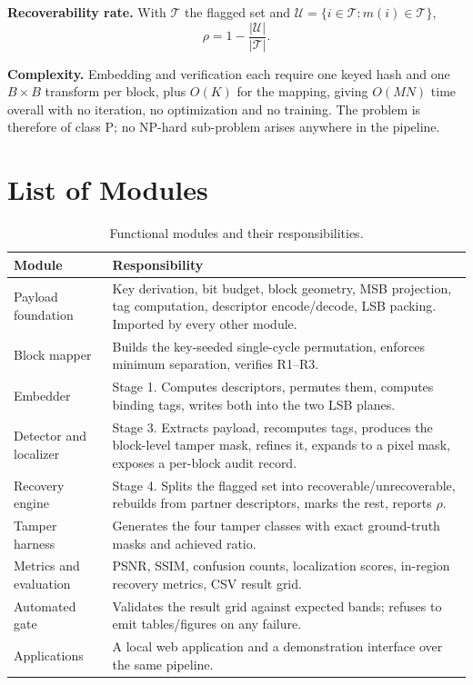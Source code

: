 \documentclass[12pt,a4paper]{article}
\begin{document}
\textbf{Recoverability rate.} With $\mathcal{T}$ the flagged set and
$\mathcal{U} = \{ i \in \mathcal{T} : m(i) \in \mathcal{T} \}$,
\begin{equation}
\rho = 1 - \frac{|\mathcal{U}|}{|\mathcal{T}|} .
\end{equation}

\textbf{Complexity.} Embedding and verification each require one keyed hash and
one $B \times B$ transform per block, plus $O(K)$ for the mapping, giving
$O(MN)$ time overall with no iteration, no optimization and no training. The
problem is therefore of class P; no NP-hard sub-problem arises anywhere in the
pipeline.

\section{List of Modules}

\begin{table}[htbp]
\centering
\caption{Functional modules and their responsibilities.}
\label{tab:modules}
\small
\begin{tabular}{@{}p{1.35in}p{4.0in}@{}}
\toprule
\textbf{Module} & \textbf{Responsibility} \\
\midrule
Payload foundation & Key derivation, bit budget, block geometry, MSB projection, tag computation, descriptor encode/decode, LSB packing. Imported by every other module. \\
Block mapper & Builds the key-seeded single-cycle permutation, enforces minimum separation, verifies R1--R3. \\
Embedder & Stage 1. Computes descriptors, permutes them, computes binding tags, writes both into the two LSB planes. \\
Detector and localizer & Stage 3. Extracts payload, recomputes tags, produces the block-level tamper mask, refines it, expands to a pixel mask, exposes a per-block audit record. \\
Recovery engine & Stage 4. Splits the flagged set into recoverable/unrecoverable, rebuilds from partner descriptors, marks the rest, reports $\rho$. \\
Tamper harness & Generates the four tamper classes with exact ground-truth masks and achieved ratio. \\
Metrics and evaluation & PSNR, SSIM, confusion counts, localization scores, in-region recovery metrics, CSV result grid. \\
Automated gate & Validates the result grid against expected bands; refuses to emit tables/figures on any failure. \\
Applications & A local web application and a demonstration interface over the same pipeline. \\
\bottomrule
\end{tabular}
\end{table}
\end{document}
